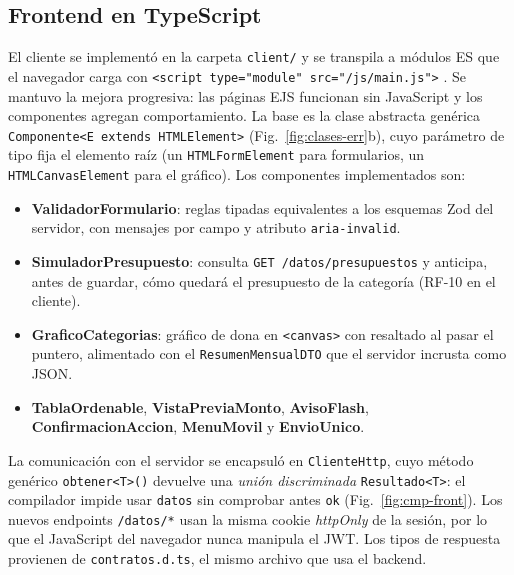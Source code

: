\documentclass[conference,a4paper]{IEEEtran}
\begin{document}
\subsection{Frontend en TypeScript}
El cliente se implementó en la carpeta \texttt{client/} y se transpila a módulos ES que el navegador carga con \texttt{<script type="module" src="/js/main.js">} \cite{mdnmodules}. Se mantuvo la mejora progresiva: las páginas EJS funcionan sin JavaScript y los componentes agregan comportamiento. La base es la clase abstracta genérica \texttt{Componente<E extends HTMLElement>} (Fig.~\ref{fig:clases-err}b), cuyo parámetro de tipo fija el elemento raíz (un \texttt{HTMLFormElement} para formularios, un \texttt{HTMLCanvasElement} para el gráfico). Los componentes implementados son:
\begin{itemize}
\item \textbf{ValidadorFormulario}: reglas tipadas equivalentes a los esquemas Zod del servidor, con mensajes por campo y atributo \texttt{aria-invalid}.
\item \textbf{SimuladorPresupuesto}: consulta \texttt{GET /datos/presupuestos} y anticipa, antes de guardar, cómo quedará el presupuesto de la categoría (RF-10 en el cliente).
\item \textbf{GraficoCategorias}: gráfico de dona en \texttt{<canvas>} con resaltado al pasar el puntero, alimentado con el \texttt{ResumenMensualDTO} que el servidor incrusta como JSON.
\item \textbf{TablaOrdenable}, \textbf{VistaPreviaMonto}, \textbf{AvisoFlash}, \textbf{ConfirmacionAccion}, \textbf{MenuMovil} y \textbf{EnvioUnico}.
\end{itemize}

La comunicación con el servidor se encapsuló en \texttt{ClienteHttp}, cuyo método genérico \texttt{obtener<T>()} devuelve una \emph{unión discriminada} \texttt{Resultado<T>}: el compilador impide usar \texttt{datos} sin comprobar antes \texttt{ok} (Fig.~\ref{fig:cmp-front}). Los nuevos endpoints \texttt{/datos/*} usan la misma cookie \emph{httpOnly} de la sesión, por lo que el JavaScript del navegador nunca manipula el JWT. Los tipos de respuesta provienen de \texttt{contratos.d.ts}, el mismo archivo que usa el backend.
\end{document}
